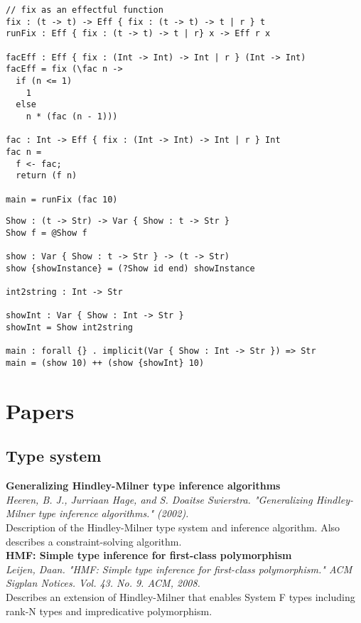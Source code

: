 \documentclass[12pt]{article}
\begin{document}
\newpage
\begin{lstlisting}[caption=Recursion effect]
// fix as an effectful function
fix : (t -> t) -> Eff { fix : (t -> t) -> t | r } t
runFix : Eff { fix : (t -> t) -> t | r} x -> Eff r x 

facEff : Eff { fix : (Int -> Int) -> Int | r } (Int -> Int)
facEff = fix (\fac n ->
  if (n <= 1)
    1
  else
    n * (fac (n - 1)))

fac : Int -> Eff { fix : (Int -> Int) -> Int | r } Int
fac n =
  f <- fac;
  return (f n)

main = runFix (fac 10)
\end{lstlisting}

\begin{lstlisting}[caption=Implicits]
Show : (t -> Str) -> Var { Show : t -> Str }
Show f = @Show f

show : Var { Show : t -> Str } -> (t -> Str)
show {showInstance} = (?Show id end) showInstance

int2string : Int -> Str

showInt : Var { Show : Int -> Str }
showInt = Show int2string

main : forall {} . implicit(Var { Show : Int -> Str }) => Str
main = (show 10) ++ (show {showInt} 10)
\end{lstlisting}

\newpage
\section{Papers}

\subsection{Type system}
\textbf{Generalizing Hindley-Milner type inference algorithms} \\
\textit{Heeren, B. J., Jurriaan Hage, and S. Doaitse Swierstra. "Generalizing Hindley-Milner type inference algorithms." (2002).} \\
Description of the Hindley-Milner type system and inference algorithm. Also describes a constraint-solving algorithm.
\\
\textbf{HMF: Simple type inference for first-class polymorphism} \\
\textit{Leijen, Daan. "HMF: Simple type inference for first-class polymorphism." ACM Sigplan Notices. Vol. 43. No. 9. ACM, 2008.} \\
Describes an extension of Hindley-Milner that enables System F types including rank-N types and impredicative polymorphism.
\end{document}
